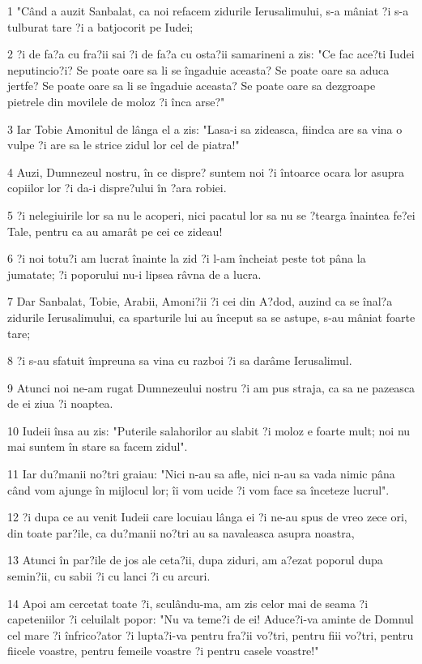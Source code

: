 \par 1 "Când a auzit Sanbalat, ca noi refacem zidurile Ierusalimului, s-a mâniat ?i s-a tulburat tare ?i a batjocorit pe Iudei;
\par 2 ?i de fa?a cu fra?ii sai ?i de fa?a cu osta?ii samarineni a zis: "Ce fac ace?ti Iudei neputincio?i? Se poate oare sa li se îngaduie aceasta? Se poate oare sa aduca jertfe? Se poate oare sa li se îngaduie aceasta? Se poate oare sa dezgroape pietrele din movilele de moloz ?i înca arse?"
\par 3 Iar Tobie Amonitul de lânga el a zis: "Lasa-i sa zideasca, fiindca are sa vina o vulpe ?i are sa le strice zidul lor cel de piatra!"
\par 4 Auzi, Dumnezeul nostru, în ce dispre? suntem noi ?i întoarce ocara lor asupra copiilor lor ?i da-i dispre?ului în ?ara robiei.
\par 5 ?i nelegiuirile lor sa nu le acoperi, nici pacatul lor sa nu se ?tearga înaintea fe?ei Tale, pentru ca au amarât pe cei ce zideau!
\par 6 ?i noi totu?i am lucrat înainte la zid ?i l-am încheiat peste tot pâna la jumatate; ?i poporului nu-i lipsea râvna de a lucra.
\par 7 Dar Sanbalat, Tobie, Arabii, Amoni?ii ?i cei din A?dod, auzind ca se înal?a zidurile Ierusalimului, ca sparturile lui au început sa se astupe, s-au mâniat foarte tare;
\par 8 ?i s-au sfatuit împreuna sa vina cu razboi ?i sa darâme Ierusalimul.
\par 9 Atunci noi ne-am rugat Dumnezeului nostru ?i am pus straja, ca sa ne pazeasca de ei ziua ?i noaptea.
\par 10 Iudeii însa au zis: "Puterile salahorilor au slabit ?i moloz e foarte mult; noi nu mai suntem în stare sa facem zidul".
\par 11 Iar du?manii no?tri graiau: "Nici n-au sa afle, nici n-au sa vada nimic pâna când vom ajunge în mijlocul lor; îi vom ucide ?i vom face sa înceteze lucrul".
\par 12 ?i dupa ce au venit Iudeii care locuiau lânga ei ?i ne-au spus de vreo zece ori, din toate par?ile, ca du?manii no?tri au sa navaleasca asupra noastra,
\par 13 Atunci în par?ile de jos ale ceta?ii, dupa ziduri, am a?ezat poporul dupa semin?ii, cu sabii ?i cu lanci ?i cu arcuri.
\par 14 Apoi am cercetat toate ?i, sculându-ma, am zis celor mai de seama ?i capeteniilor ?i celuilalt popor: "Nu va teme?i de ei! Aduce?i-va aminte de Domnul cel mare ?i înfrico?ator ?i lupta?i-va pentru fra?ii vo?tri, pentru fiii vo?tri, pentru fiicele voastre, pentru femeile voastre ?i pentru casele voastre!"
